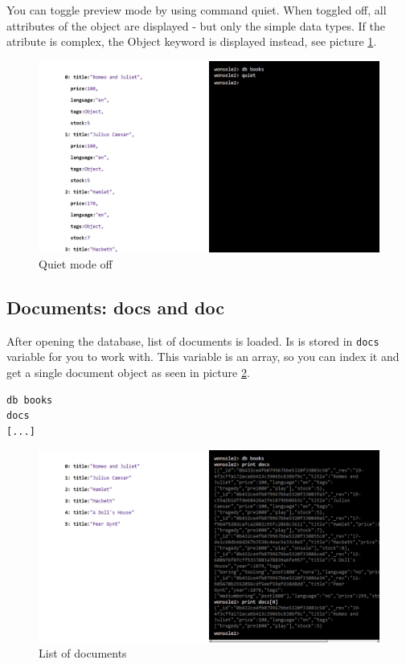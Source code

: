 You can toggle preview mode by using command quiet. When toggled off, all
attributes of the object are displayed - but only the simple data types. If the
atribute is complex, the Object keyword is displayed instead, see picture
\ref{wonsole2-20}.

\begin{figure}
\centering
\includegraphics[width=\textwidth]{../../manual/screenshot/wonsole2/wonsole2-20.png}
\caption{Quiet mode off}
\label{wonsole2-20}
\end{figure}


\subsection{Documents: docs and doc}
After opening the database, list of documents is loaded. Is is stored in
\verb|docs| variable for you to work with. This variable is an array, so you can
index it and get a single document object as seen in picture \ref{wonsole2-26}.

\begin{verbatim}
db books
docs
[...]
\end{verbatim}
 

\begin{figure}
\centering
\includegraphics[width=\textwidth]{../../manual/screenshot/wonsole2/wonsole2-26.png}
\caption{List of documents}
\label{wonsole2-26}
\end{figure}

